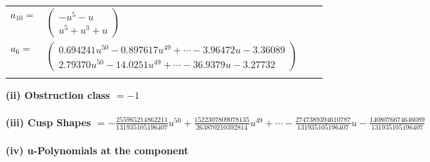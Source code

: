 \documentclass[1p]{elsarticle_modified}
\theoremstyle{definition}
\begin{document}
\begin{tabular}{m{7pt} m{180pt} m{7pt} m{180pt} }
\flushright $a_{10}=$&$\begin{pmatrix}- u^5- u\\u^5+u^3+u\end{pmatrix}$ \\
\flushright $a_{6}=$&$\begin{pmatrix}0.694241 u^{50}-0.897617 u^{49}+\cdots-3.96472 u-3.36089\\2.79370 u^{50}-14.0251 u^{49}+\cdots-36.9379 u-3.27732\end{pmatrix}$\\&\end{tabular}
\flushleft \textbf{(ii) Obstruction class $= -1$}\\~\\
\flushleft \textbf{(iii) Cusp Shapes $= -\frac{255965214862211}{131935105196407} u^{50}+\frac{1522307809078135}{263870210392814} u^{49}+\cdots-\frac{2747389394610787}{131935105196407} u-\frac{1408076674646089}{131935105196407}$}\\~\\
\newpage\renewcommand{\arraystretch}{1}
\flushleft \textbf{(iv) u-Polynomials at the component}\newline \\
\end{document}
